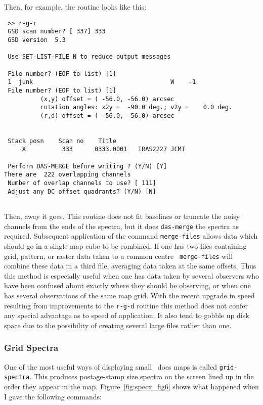 Then, for example, the routine looks like this:

\begin{verbatim} >> r-g-r
 GSD scan number? [ 337] 333
 GSD version  5.3
 
 Use SET-LIST-FILE N to reduce output messages
 
 File number? (EOF to list) [1]  
 1  junk                                      W    -1
 File number? (EOF to list) [1] 
          (x,y) offset = ( -56.0, -56.0) arcsec
          rotation angles: x2y =  -90.0 deg.; v2y =    0.0 deg.
          (r,d) offset = ( -56.0, -56.0) arcsec
 
 
 Stack posn    Scan no    Title
     X          333      0333.0001   IRAS2227 JCMT 

 Perform DAS-MERGE before writing ? (Y/N) [Y] 
There are  222 overlapping channels
 Number of overlap channels to use? [ 111] 
 Adjust any DC offset quadrants? (Y/N) [N] 
 
\end{verbatim} 

Then, away it goes. This routine does not fit baselines or truncate
the noisy channels from the ends of the spectra, but it
does {\tt das-merge} the spectra as required. Subsequent application
of the command {\tt merge-files} allows data which should go in a
single map cube to be combined. If one has two files containing 
grid, pattern, or raster data taken to a common centre {\tt
merge-files} will combine these data in a third file, averaging data
taken at the same offsets. Thus this method is especially useful when
one has data taken by several observers who have been confused about
exactly where they should be observing, or when one has several
observations of the same map grid. With the recent upgrade in speed
resulting from improvements to the {\tt r-g-d} routine this method
does not confer any special advantage as to speed of application. It
also tend to gobble up disk space due to the possibility of creating
several large files rather than one.  
 
\subsubsection{Grid Spectra}
\label{sec:specx_13.3}
One of the most useful ways of displaying small \SPECX\ does maps is
called {\tt grid-spectra}. This produces postage-stamp size spectra on
the screen lined up in the order they appear in the map.
Figure~\ref{fig:specx_fig6} shows what happened when I gave the
following commands:

